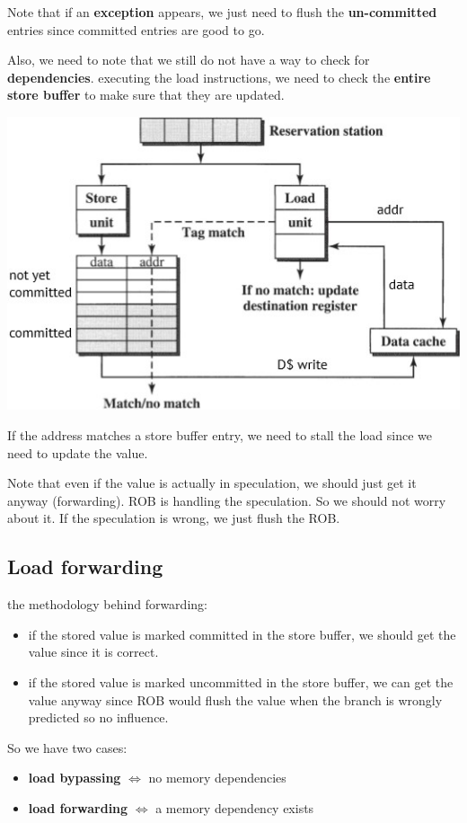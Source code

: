 \documentclass[letterpaper,12pt]{article}
\begin{document}
Note that if an \textbf{exception} appears, we just need to flush the \textbf{un-committed} entries since committed entries are good to go.

Also, we need to note that we still do not have a way to check for \textbf{dependencies}.  executing the load instructions, we need to check the \textbf{entire store buffer} to make sure that they are updated.

\includegraphics*[scale = 0.7]{./Image/Store Buffer Plus.jpg}

If the address matches a store buffer entry, we need to stall the load since we need to update the value.

Note that even if the value is actually in speculation, we should just get it anyway (forwarding). ROB is handling the speculation. So we should not worry about it. If the speculation is wrong, we just flush the ROB.

\subsection{Load forwarding}
the methodology behind forwarding:
\begin{itemize}
    \item if the stored value is marked committed in the store buffer, we should get the value since it is correct.
    \item if the stored value is marked uncommitted in the store buffer, we can get the value anyway since ROB would flush the value when the branch is wrongly predicted so no influence.
\end{itemize}

So we have two cases:
\begin{itemize}
    \item \textbf{load bypassing} $\iff$ no memory dependencies
    \item \textbf{load forwarding} $\iff$ a memory dependency exists
\end{itemize}
\end{document}
